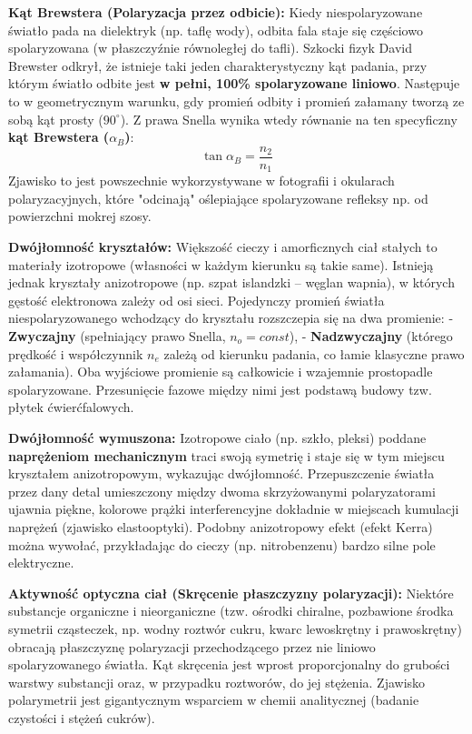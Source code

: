 \documentclass[11pt, a4paper]{article}
\begin{document}
\textbf{Kąt Brewstera (Polaryzacja przez odbicie):}
Kiedy niespolaryzowane światło pada na dielektryk (np. taflę wody), odbita fala staje się częściowo spolaryzowana (w płaszczyźnie równoległej do tafli). Szkocki fizyk David Brewster odkrył, że istnieje taki jeden charakterystyczny kąt padania, przy którym światło odbite jest \textbf{w pełni, 100\% spolaryzowane liniowo}. Następuje to w geometrycznym warunku, gdy promień odbity i promień załamany tworzą ze sobą kąt prosty ($90^\circ$). Z prawa Snella wynika wtedy równanie na ten specyficzny \textbf{kąt Brewstera ($\alpha_B$)}:
\[
\tan\alpha_B = \frac{n_2}{n_1}
\]
Zjawisko to jest powszechnie wykorzystywane w fotografii i okularach polaryzacyjnych, które "odcinają" oślepiające spolaryzowane refleksy np. od powierzchni mokrej szosy.

\textbf{Dwójłomność kryształów:}
Większość cieczy i amorficznych ciał stałych to materiały izotropowe (własności w każdym kierunku są takie same). Istnieją jednak kryształy anizotropowe (np. szpat islandzki – węglan wapnia), w których gęstość elektronowa zależy od osi sieci. Pojedynczy promień światła niespolaryzowanego wchodzący do kryształu rozszczepia się na dwa promienie: 
- \textbf{Zwyczajny} (spełniający prawo Snella, $n_o = const$),
- \textbf{Nadzwyczajny} (którego prędkość i współczynnik $n_e$ zależą od kierunku padania, co łamie klasyczne prawo załamania).
Oba wyjściowe promienie są całkowicie i wzajemnie prostopadle spolaryzowane. Przesunięcie fazowe między nimi jest podstawą budowy tzw. płytek ćwierćfalowych.

\textbf{Dwójłomność wymuszona:}
Izotropowe ciało (np. szkło, pleksi) poddane \textbf{naprężeniom mechanicznym} traci swoją symetrię i staje się w tym miejscu kryształem anizotropowym, wykazując dwójłomność. Przepuszczenie światła przez dany detal umieszczony między dwoma skrzyżowanymi polaryzatorami ujawnia piękne, kolorowe prążki interferencyjne dokładnie w miejscach kumulacji naprężeń (zjawisko elastooptyki). Podobny anizotropowy efekt (efekt Kerra) można wywołać, przykładając do cieczy (np. nitrobenzenu) bardzo silne pole elektryczne.

\textbf{Aktywność optyczna ciał (Skręcenie płaszczyzny polaryzacji):}
Niektóre substancje organiczne i nieorganiczne (tzw. ośrodki chiralne, pozbawione środka symetrii cząsteczek, np. wodny roztwór cukru, kwarc lewoskrętny i prawoskrętny) obracają płaszczyznę polaryzacji przechodzącego przez nie liniowo spolaryzowanego światła. Kąt skręcenia jest wprost proporcjonalny do grubości warstwy substancji oraz, w przypadku roztworów, do jej stężenia. Zjawisko polarymetrii jest gigantycznym wsparciem w chemii analitycznej (badanie czystości i stężeń cukrów).
\end{document}

